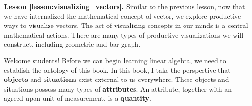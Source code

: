 \textbf{Lesson \ref{lesson:visualizing_vectors}.}  Similar to the previous lesson, now that we have internalized the mathematical concept of vector, we explore productive ways to visualize vectors.  The act of visualizing concepts in our minds is a central mathematical actions.  There are many types of productive visualizations we will construct, including geometric and bar graph.







\newpage



\label{lesson:vectors_as_lists_of_quantities}

Welcome students!  
Before we can begin learning linear algebra, we need to establish the ontology of this book.
In this book, I take the perspective that \textbf{objects} and \textbf{situations} exist external to us everywhere.    
These objects and situations possess many types of \textbf{attributes}.   
An attribute, together with an agreed upon unit of measurement, is a \textbf{quantity}.


